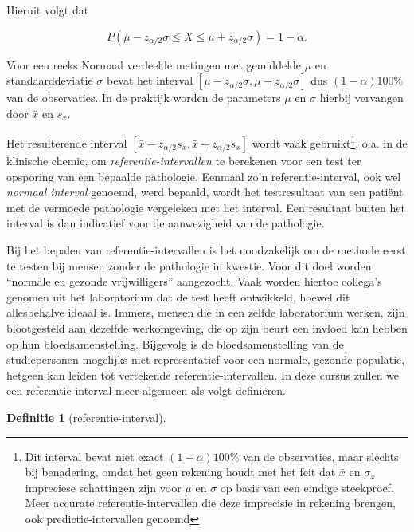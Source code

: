\documentclass[
  12pt,dutch]{book}
\theoremstyle{definition}
\newtheorem{definition}{Definitie}[chapter]
\theoremstyle{definition}
\theoremstyle{definition}
\theoremstyle{definition}
\theoremstyle{remark}
\begin{document}
Hieruit volgt dat

\begin{equation*}
P( \mu - z_{\alpha/2} \sigma \leq X \leq \mu + z_{\alpha/2} \sigma ) =
1-\alpha .
\end{equation*}

Voor een reeks Normaal verdeelde metingen met gemiddelde \(\mu\) en
standaarddeviatie \(\sigma\) bevat het interval \([\mu-z_{\alpha/2}\sigma,\mu+z_{\alpha/2}\sigma]\) dus \((1-\alpha)100\%\) van de observaties. In de
praktijk worden de parameters \(\mu\) en \(\sigma\) hierbij vervangen door \(\bar x\) en \(s_x\).

Het resulterende interval \([\bar x-z_{\alpha/2}s_x,\bar x+z_{\alpha/2}s_x]\)
wordt vaak gebruikt\footnote{Dit interval bevat niet exact \((1-\alpha)100\%\) van de observaties, maar slechts bij benadering, omdat het geen rekening houdt met het feit dat \(\bar x\) en \(\sigma_x\) impreciese schattingen zijn voor \(\mu\) en \(\sigma\) op basis van een eindige steekproef. Meer accurate referentie-intervallen die deze imprecisie in rekening brengen, ook predictie-intervallen genoemd}, o.a. in de klinische chemie, om \emph{referentie-intervallen} te berekenen voor een test ter opsporing van een
bepaalde pathologie. Eenmaal zo'n referentie-interval, ook wel \emph{normaal interval} genoemd, werd bepaald, wordt het testresultaat van een
patiënt met de vermoede pathologie vergeleken met het interval. Een
resultaat buiten het interval is dan indicatief voor de aanwezigheid van de
pathologie.

Bij het bepalen van referentie-intervallen is het noodzakelijk om de methode
eerst te testen bij mensen zonder de pathologie in kwestie. Voor dit doel
worden ``normale en gezonde vrijwilligers'' aangezocht. Vaak worden hiertoe
collega's genomen uit het laboratorium dat de test heeft ontwikkeld, hoewel
dit allesbehalve ideaal is. Immers, mensen die in een zelfde laboratorium
werken, zijn blootgesteld aan dezelfde werkomgeving, die op zijn beurt een
invloed kan hebben op hun bloedsamenstelling. Bijgevolg is de
bloedsamenstelling van de studiepersonen mogelijks niet representatief voor
een normale, gezonde populatie, hetgeen kan leiden tot vertekende
referentie-intervallen. In deze cursus zullen we een referentie-interval
meer algemeen als volgt definiëren.

\begin{definition}[referentie-interval]
\protect\hypertarget{def:unnamed-chunk-44}{}\label{def:unnamed-chunk-44}~
\end{definition}
\end{document}
